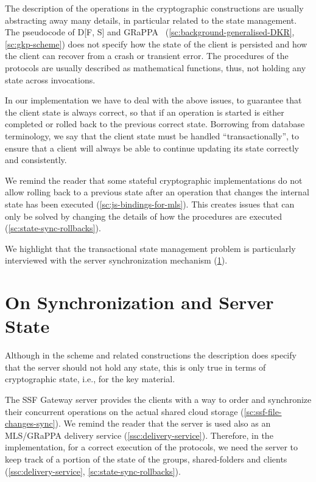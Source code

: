 The description of the operations in the cryptographic
constructions are usually abstracting away many details,
in particular related to the state management.
The pseudocode of D[F, S] and GRaPPA~\cite{GKP} (\cref{sc:background-generalised-DKR}, \cref{sc:gkp-scheme}) 
does not specify how the state of the client is persisted 
and how the client can recover from a crash or transient error.
The procedures of the protocols are usually described as
mathematical functions, thus, not holding any state across
invocations.

In our implementation we have to deal with the above issues,
to guarantee that the client state is always correct,
so that if an operation is started is either completed
or rolled back to the previous correct state.
Borrowing from database terminology, we say that the client
state must be handled ``transactionally'', to ensure that
a client will always be able to continue updating its state
correctly and consistently.

We remind the reader that some stateful cryptographic implementations do not
allow rolling back to a previous state after an operation
that changes the internal state has been executed (\cref{sc:js-bindings-for-mls}).
This creates issues that can only be solved by changing
the details of how the procedures are executed (\cref{sc:state-sync-rollbacks}).

We highlight that the transactional state management problem
is particularly interviewed with the server synchronization
mechanism (\cref{sc:gap-synchronization-server-state}).


\section{On Synchronization and Server State}\label{sc:gap-synchronization-server-state}

Although in the scheme and related constructions the description
does specify that the server should not hold any state,
this is only true in terms of cryptographic state, i.e., for
the key material.

The SSF Gateway server provides the clients with a way to order and synchronize
their concurrent operations on the actual shared cloud storage (\cref{sc:ssf-file-changes-sync}).
We remind the reader that 
the server is used also as an MLS/GRaPPA delivery service (\cref{ssc:delivery-service}).
Therefore, in the implementation, for a correct execution of the protocols, 
we need the server
to keep track of a portion of the state of the groups, 
shared-folders and clients (\cref{ssc:delivery-service}, \cref{sc:state-sync-rollbacks}).


